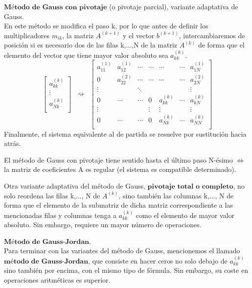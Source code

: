 \begin{nlist}
\item $\textbf{Método de Gauss con pivotaje}$ (o pivotaje parcial), variante adaptativa de Gauss.\\
En este método se modifica el paso k, por lo que antes de definir los multiplicadores $m_{ik}$, la matriz $A^{(k+1)}$ y el vector $b^{(k+1)}$, intercambiaremos de posición si es necesario dos de las filas k,...,N de la matriz $A^{(k)}$ de forma que el elemento del vector que tiene mayor valor absoluto sea $a_{kk}^{(k)}$.
\[
\begin{bmatrix}
a_{kk}^{(k)} \\
\vdots \\
a_{Nk}^{(k)} \\
\end{bmatrix}
\; \; \rightsquigarrow \; \;
\begin{bmatrix}
a_{11}^{(1)} & a_{12}^{(1)} & \cdots & \cdots & \cdots & \cdots & a_{1N}^{(1)} \\
0 & a_{22}^{(2)} & \cdots & \cdots & \cdots & \cdots & a_{2N}^{(2)} \\
\vdots & & \ddots & & & & \vdots \\
0 & \cdots & \cdots & 0 & a_{kk}^{(k)} & \cdots & a_{kN}^{(k)} \\
\vdots & & & \vdots & \vdots & & \vdots \\
0 & \cdots & \cdots & 0 & a_{Nk}^{(k)} & \cdots & a_{NN}^{(k)}\\
\end{bmatrix}
\]
Finalmente, el sistema equivalente al de partida se resuelve por sustitución hacia atrás.
	\begin{nota}
	El método de Gauss con pivotaje tiene sentido hasta el último paso N-ésimo $\Leftrightarrow$ la matriz de coeficientes A es regular (el sistema es compatible determinado).
	\end{nota}

	\begin{nota}
	Otra variante adaptativa del método de Gauss, $\textbf{pivotaje total o completo}$, no solo
reordena las filas k,..., N de $A^{(k)}$, sino también las columnas k,..., N de forma
que el elemento de la submatriz de dicha matriz correspondiente a las
mencionadas filas y columnas tenga a $a_{kk}^{(k)}$ como el elemento de mayor valor absoluto. Sin embargo, requiere un mayor número de operaciones.
	\end{nota}

\item $\textbf{Método de Gauss-Jordan}$.\\
Para terminar con las variantes del método de Gauss, mencionemos el llamado $\textbf{método}$ $\textbf{de}$ $\textbf{Gauss-Jordan}$, que consiste en hacer ceros no solo debajo de $a_{kk}^{(k)}$ sino
también por encima, con el mismo tipo de fórmula. Sin embargo, su coste en operaciones aritméticas es superior.
\end{nlist}

